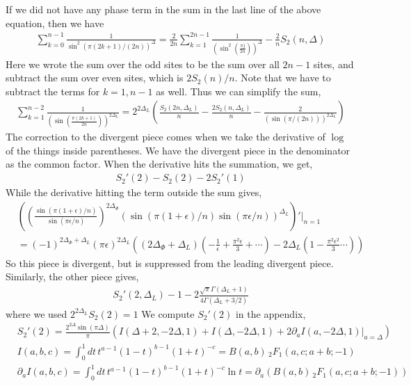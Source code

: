 \documentclass[11pt]{article}
\newcommand{\ep}{\epsilon}
\newcommand{\p}{\partial}
\newcommand{\lb}{\left(}
\newcommand{\rb}{\right)}
\begin{document}
If we did not have any phase term in the sum in the last line of the above equation, then we have
\begin{align}
    \sum_{k=0}^{n-1} \frac{1}{\sin^2 \lb \pi (2k+1) / (2n)\rb^{\Delta}}= \frac{2}{2n}\sum_{k=1}^{2n-1} \frac{1}{\lb \sin^2\lb \frac{\pi j }{2n}\rb \rb^{\Delta}} -\frac{2}{n}S_2(n,\Delta)
\end{align}
Here we wrote the sum over the odd sites to be the sum over all $2n-1$ sites, and subtract the sum over even sites, which is $2S_2(n)/n$. Note that we have to subtract the terms for $k=1,n-1$ as well. 
Thus we can simplify the sum,
\begin{align}
    \sum_{k=1}^{n-2} \frac{1}{\lb \sin\lb \frac{ \pi(2k+1)}{2n}\rb\rb^{2\Delta_L } } = 2^{2\Delta_L}\lb \frac{S_2(2n,\Delta_L)}{n} - \frac{2S_2(n,\Delta_L)}{n} - \frac{2}{\lb \sin(\pi/(2n))\rb^{2\Delta_L}}\rb 
\end{align} 
The correction to the divergent piece comes when we take the derivative of $\log$ of the things inside parentheses. 
We have the divergent piece in the denominator as the common factor. When the derivative hits the summation, we get,
\begin{align}
    S_2'(2) -S_2(2) - 2S_2'(1) 
\end{align}
While the derivative hitting the term outside the sum gives,
\begin{align}
  &  \lb \lb\frac{ \sin \lb \pi (1+\ep)/n\rb }{ \sin (\pi \ep / n)}\rb^{2\Delta_\Phi}(\sin (\pi (1+\ep)/n)\sin (\pi \ep/n))^{ \Delta_L}\rb'\Bigg|_{n=1} \\&= (-1)^{2\Delta_\Phi+\Delta_L}(\pi \ep)^{2\Delta_L} \lb (2\Delta_\Phi + \Delta_L) \lb -\frac{1}{\ep} + \frac{\pi^2 \ep}{3} + \cdots \rb  - 2\Delta_L\lb 1-\frac{\pi^2 \ep^2}{3} \cdots\rb\rb
\end{align}
So this piece is divergent, but is suppressed from the leading divergent piece. Similarly, the other piece gives,
\begin{align}
     S_2'(2,\Delta_L) -1 -2\frac{\sqrt{\pi } \Gamma(\Delta_L + 1)}{4\Gamma (\Delta_L + 3/2)} 
\end{align}
where we used $2^{2\Delta_L}S_2(2) = 1$
We compute $S_2'(2)$ in the appendix,
\begin{align}
    &S_2'(2) = \frac{2^{2\Delta}\sin(\pi \Delta)}{\pi} \lb I(\Delta +2,-2\Delta,1) + I(\Delta ,-2\Delta,1) +2\p_aI(a,-2\Delta,1)|_{a=\Delta} \rb\\
    & I (a,b,c) = \int_0^1 dt \, t^{a-1}(1-t)^{b-1} (1+t)^{-c} = B(a,b) \,_2F_1(a,c;a+b;-1) \\
    & \p_a I (a,b,c) = \int_0^1 dt \, t^{a-1}(1-t)^{b-1} (1+t)^{-c} \ln t = \p_a \lb B(a,b) \,_2F_1(a,c;a+b;-1)\rb 
\end{align}
\end{document}
